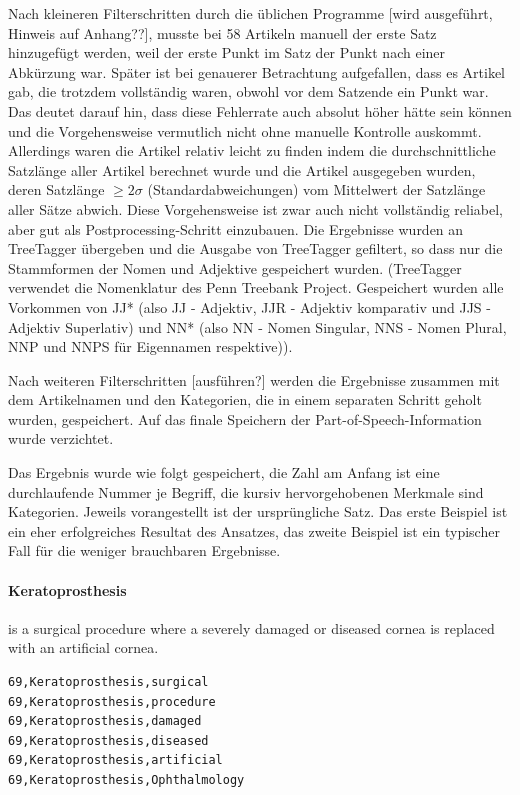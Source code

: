 \documentclass[pagesize,DIV=calc,12pt,draft]{scrreprt}
\begin{document}
\begin{inparaenum}
\item Nach kleineren Filterschritten durch die üblichen Programme {[}wird ausgeführt, Hinweis auf Anhang??{]}, musste bei 58 Artikeln manuell der erste Satz hinzugefügt werden, weil der erste Punkt im Satz der Punkt nach einer Abkürzung war. 
Später ist bei genauerer Betrachtung aufgefallen, dass es Artikel gab, die trotzdem vollständig waren, obwohl vor dem Satzende ein Punkt war. 
Das deutet darauf hin, dass diese Fehlerrate auch absolut höher hätte sein können und die Vorgehensweise vermutlich nicht ohne manuelle Kontrolle auskommt. 
Allerdings waren die Artikel relativ leicht zu finden indem die durchschnittliche Satzlänge aller Artikel berechnet wurde und die Artikel ausgegeben wurden, deren Satzlänge $\geq 2 \sigma $ (Standardabweichungen) vom Mittelwert der Satzlänge aller Sätze abwich. 
Diese Vorgehensweise ist zwar auch nicht vollständig reliabel, aber gut als Postprocessing-Schritt einzubauen. 
Die Ergebnisse wurden an TreeTagger übergeben und die Ausgabe von TreeTagger gefiltert, so dass nur die Stammformen der Nomen und Adjektive gespeichert wurden. (TreeTagger verwendet die Nomenklatur des Penn Treebank Project. 
Gespeichert wurden alle Vorkommen von JJ* (also JJ - Adjektiv, JJR - Adjektiv komparativ und JJS - Adjektiv Superlativ) und NN* (also NN - Nomen Singular, NNS - Nomen Plural, NNP und NNPS für Eigennamen respektive)). 

\item Nach weiteren Filterschritten {[}ausführen?{]} werden die Ergebnisse zusammen mit dem Artikelnamen und den Kategorien, die in einem separaten Schritt geholt wurden, gespeichert. 
Auf das finale Speichern der Part-of-Speech-Information wurde verzichtet. 
\end{inparaenum}

Das Ergebnis wurde wie folgt gespeichert, die Zahl am Anfang ist eine durchlaufende Nummer je Begriff, die kursiv hervorgehobenen Merkmale sind Kategorien. 
Jeweils vorangestellt ist der ursprüngliche Satz. 
Das erste Beispiel ist ein eher erfolgreiches Resultat des Ansatzes, das zweite Beispiel ist ein typischer Fall für die weniger brauchbaren Ergebnisse. 

\paragraph{Keratoprosthesis} is a surgical procedure where a severely damaged or diseased cornea is replaced with an artificial cornea.

\begin{lstlisting}
69,Keratoprosthesis,surgical 
69,Keratoprosthesis,procedure
69,Keratoprosthesis,damaged 
69,Keratoprosthesis,diseased
69,Keratoprosthesis,artificial 
69,Keratoprosthesis,Ophthalmology
\end{lstlisting}
\end{document}
